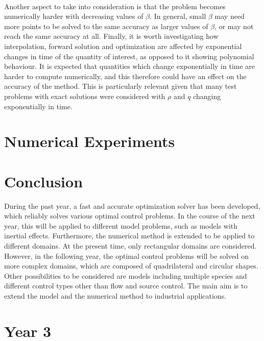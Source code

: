\documentclass[11pt, a4paper]{article}
\theoremstyle{definition}
\newcommand{\adj}{q}
\begin{document}
	\\
	Another aspect to take into consideration is that the problem becomes numerically harder with decreasing values of $\beta$. In general, small $\beta$ may need more points to be solved to the same accuracy as larger values of $\beta$, or may not reach the same accuracy at all.  Finally, it is worth investigating how interpolation, forward solution and optimization are affected by exponential changes in time of the quantity of interest, as opposed to it showing polynomial behaviour. It is expected that quantities which change exponentially in time are harder to compute numerically, and this therefore could have an effect on the accuracy of the method. This is particularly relevant given that many test problems with exact solutions were considered with $\rho$ and $\adj$ changing exponentially in time.
	
	
	\section{Numerical Experiments} \label{sec:Examples}
	
	
	\section{Conclusion}
	During the past year, a fast and accurate optimization solver has been developed, which reliably solves various optimal control problems. In the course of the next year, this will be applied to different model problems, such as models with inertial effects. Furthermore, the numerical method is extended to be applied to different domains. At the present time, only rectangular domains are considered. However, in the following year, the optimal control problems will be solved on more complex domains, which are composed of quadrilateral and circular shapes. 
	Other possibilities to be considered are models including multiple species and different control types other than flow and source control.
	The main aim is to extend the model and the numerical method to industrial applications.
	

\section*{Year 3}	
	
	
	
	
	
	
	
	
	
	
	
	\pagebreak	
	
	
	
	
\end{document}
